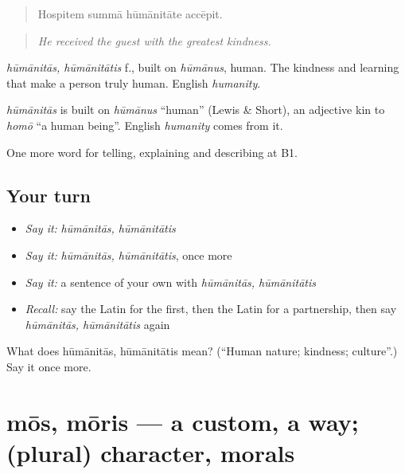 \begin{quote}
Hospitem summā hūmānitāte accēpit.
\end{quote}

\begin{quote}
\emph{He received the guest with the greatest kindness.}
\end{quote}

\emph{hūmānitās, hūmānitātis} f., built on \emph{hūmānus}, human. The kindness and learning that make a person truly human. English \emph{humanity}.

\begin{cousinweb}
\emph{hūmānitās} is built on \emph{hūmānus} \textquotedblleft{}human\textquotedblright{} (Lewis \& Short), an adjective kin to \emph{homō} \textquotedblleft{}a human being\textquotedblright{}. English \emph{humanity} comes from it.
\end{cousinweb}

\begin{grammarlens}[title={What you've built}]
One more word for telling, explaining and describing at B1.
\end{grammarlens}

\subsection*{Your turn}
\begin{itemize}
\raggedright
  \item \emph{Say it:} \emph{hūmānitās, hūmānitātis}
  \item \emph{Say it:} \emph{hūmānitās, hūmānitātis}, once more
  \item \emph{Say it:} a sentence of your own with \emph{hūmānitās, hūmānitātis}
  \item \emph{Recall:} say the Latin for the first, then the Latin for a partnership, then say \emph{hūmānitās, hūmānitātis} again
\end{itemize}

\begin{tcolorbox}[breakable,colback=teal!4,colframe=teal!35!black,title={Before you move on}]
What does hūmānitās, hūmānitātis mean? (\textquotedblleft{}Human nature; kindness; culture\textquotedblright{}.) Say it once more.
\end{tcolorbox}
\section[mōs, mōris]{mōs, mōris — a custom, a way; (plural) character, morals}

